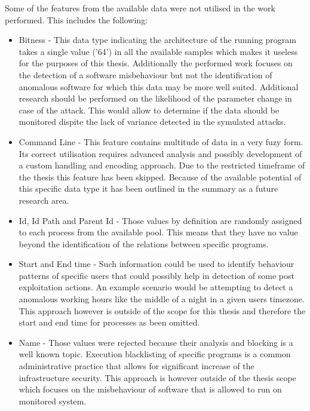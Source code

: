 \documentclass[a4paper,twoside,12pt]{book}
\begin{document}
Some of the features from the available data were not utilised in the work performed. This includes
the following:
\begin{itemize}
	\item Bitness - This data type indicating the architecture of the running program takes a single value ('64')
	in all the available samples which makes it useless for the purposes of this thesis. Additionally the performed
	work focuses on the detection of a software misbehaviour but not the identification of anomalous software 
	for which this data may be more well suited. Additional research should be performed on the likelihood of the
	parameter change in case of the attack. This would allow to determine if the data should be monitored dispite
	the lack of variance detected in the symulated attacks.
	\item Command Line -  This feature contains multitude of data in a very fuzy form. Its correct utilisation
	requires advanced analysis and possibly development of a custom handling and encoding approach. Due 
	to the restricted timeframe of the thesis this feature has been skipped. Because of the available potential
	of this specific data type it has been outlined in the summary as a future research area.
	\item Id, Id Path and Parent Id - Those values by definition are randomly assigned to each process from the available
	pool. This means that they have no value beyond the identification of the relations between specific programs. 
	\item Start and End time - Such information could be used to identify behaviour patterns of specific users that could possibly help
	in detection of some post exploitation actions. An example scenario would be attempting to detect a anomalous
	working hours like the middle of a night in a given users timezone. This approach however is outside of the 
	scope for this thesis and therefore the start and end time for processes as been omitted.
	\item Name - Those values were rejected because their analysis and blocking is a well known topic. Execution 
	blacklisting of specific programs is a common administrative practice that allows for significant increase
	of the infrastructure security. This approach is however outside of the thesis scope which focuses on the 
	misbehaviour of software that is allowed to run on monitored system.
\end{itemize}
\end{document}
